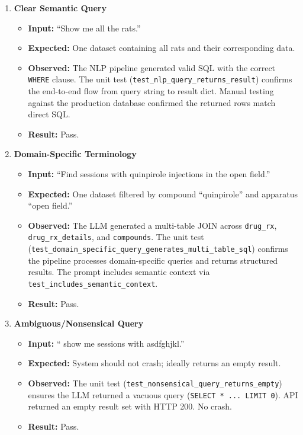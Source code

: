 \documentclass[12pt, titlepage]{article}
\begin{document}
\begin{enumerate}[label=\textbf{FR2-T\arabic*:}, leftmargin=*, labelsep=1em]
\sloppy

  \item \textbf{Clear Semantic Query}
  \begin{itemize}
    \item \textbf{Input:} ``Show me all the rats.''
    \item \textbf{Expected:} One dataset containing all rats and their corresponding data.
    \item \textbf{Observed:} The NLP pipeline generated valid SQL with the correct \texttt{WHERE} clause.
      The unit test (\texttt{test\_\allowbreak{}nlp\_\allowbreak{}query\_\allowbreak{}returns\_\allowbreak{}result}) confirms the end-to-end flow
      from query string to result dict. Manual testing against the production database confirmed the returned rows match direct SQL.
    \item \textbf{Result:} Pass.
  \end{itemize}

  \item \textbf{Domain-Specific Terminology}
  \begin{itemize}
    \item \textbf{Input:} ``Find sessions with quinpirole injections in the open field.''
    \item \textbf{Expected:} One dataset filtered by compound ``quinpirole'' and apparatus ``open field.''
    \item \textbf{Observed:} The LLM generated a multi-table JOIN across \texttt{drug\_\allowbreak{}rx},
      \texttt{drug\_\allowbreak{}rx\_\allowbreak{}details}, and \texttt{compounds}.
      The unit test (\texttt{test\_\allowbreak{}domain\_\allowbreak{}specific\_\allowbreak{}query\_\allowbreak{}generates\_\allowbreak{}multi\_\allowbreak{}table\_\allowbreak{}sql})
      confirms the pipeline processes domain-specific queries and returns structured results.
      The prompt includes semantic context via \texttt{test\_\allowbreak{}includes\_\allowbreak{}semantic\_\allowbreak{}context}.
    \item \textbf{Result:} Pass.
  \end{itemize}

  \item \textbf{Ambiguous/Nonsensical Query}
  \begin{itemize}
    \item \textbf{Input:} `` show me sessions with asdfghjkl.''
    \item \textbf{Expected:} System should not crash; ideally returns an empty result.
    \item \textbf{Observed:} The unit test (\texttt{test\_\allowbreak{}nonsensical\_\allowbreak{}query\_\allowbreak{}returns\_\allowbreak{}empty}) 
      ensures the LLM returned a vacuous query (\texttt{SELECT * ... LIMIT 0}). API returned an empty result set with HTTP 200. No crash.
    \item \textbf{Result:} Pass.
  \end{itemize}


\end{enumerate}
\end{document}
